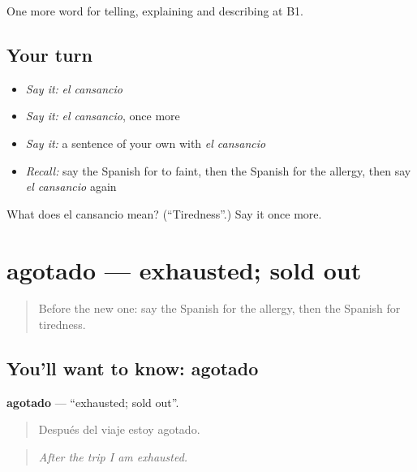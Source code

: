 \begin{grammarlens}[title={What you've built}]
One more word for telling, explaining and describing at B1.
\end{grammarlens}

\subsection*{Your turn}
\begin{itemize}
\raggedright
  \item \emph{Say it:} \emph{el cansancio}
  \item \emph{Say it:} \emph{el cansancio}, once more
  \item \emph{Say it:} a sentence of your own with \emph{el cansancio}
  \item \emph{Recall:} say the Spanish for to faint, then the Spanish for the allergy, then say \emph{el cansancio} again
\end{itemize}

\begin{tcolorbox}[breakable,colback=teal!4,colframe=teal!35!black,title={Before you move on}]
What does el cansancio mean? (\textquotedblleft{}Tiredness\textquotedblright{}.) Say it once more.
\end{tcolorbox}
\section[agotado]{agotado — exhausted; sold out}

\label{lesson:ES-C741-agotado}



\begin{quote}
Before the new one: say the Spanish for the allergy, then the Spanish for tiredness.
\end{quote}

\subsection*{You'll want to know: agotado}
\textbf{agotado} — \textquotedblleft{}exhausted; sold out\textquotedblright{}.

\begin{quote}
Después del viaje estoy agotado.
\end{quote}

\begin{quote}
\emph{After the trip I am exhausted.}
\end{quote}

